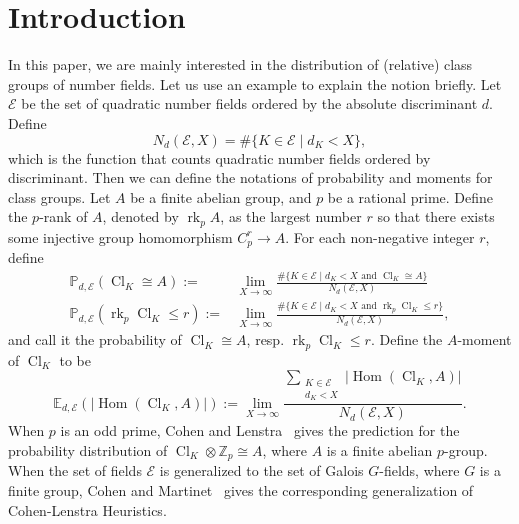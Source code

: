 \documentclass{amsart}
\numberwithin{equation}{section}
\theoremstyle{plain}
\theoremstyle{definition}
\theoremstyle{remark}
\begin{document}
\section{Introduction}\label{section: intro}
In this paper, we are mainly interested in the distribution of (relative) class groups of number fields.
Let us use an example to explain the notion briefly.
Let $\mathcal{E}$ be the set of quadratic number fields ordered by the absolute discriminant $d$.
Define
\begin{equation*}
	N_{d}(\mathcal{E},X)=\#\{K\in\mathcal{E}\mid d_K<X\},
\end{equation*}
which is the function that counts quadratic number fields ordered by discriminant.
Then we can define the notations of probability and moments for class groups.
Let $A$ be a finite abelian group, and $p$ be a rational prime.
Define the $p$-rank of $A$, denoted by $\operatorname{rk}_pA$, as the largest number $r$ so that there exists some injective group homomorphism $C_p^r\to A$.
For each non-negative integer $r$, define
\begin{equation*}
	\begin{aligned}
		\mathbb{P}_{d,\mathcal{E}}(\operatorname{Cl}_K\cong A):=
		&\lim_{X\to\infty}
		\frac{
			\#\{K\in\mathcal{E}\mid d_K<X\text{ and }\operatorname{Cl}_K\cong A\}
		}
		{
			N_{d}(\mathcal{E},X)
		}
		\\
		\mathbb{P}_{d,\mathcal{E}}(\operatorname{rk}_p\operatorname{Cl}_K\leq r):=
		&\lim_{X\to\infty}
		\frac{
			\#\{K\in\mathcal{E}\mid d_K<X\text{ and }\operatorname{rk}_p\operatorname{Cl}_K\leq r\}
		}
		{
			N_{d}(\mathcal{E},X)
		},
	\end{aligned}	
\end{equation*}
and call it the probability of $\operatorname{Cl}_K\cong A$, resp. $\operatorname{rk}_p\operatorname{Cl}_K\leq r$.
Define the $A$-moment of $\operatorname{Cl}_K$ to be
\begin{equation*}
	\mathbb{E}_{d,\mathcal{E}}(\lvert\operatorname{Hom}(\operatorname{Cl}_K,A)\rvert):=
	\lim_{X\to\infty}
	\frac{
		\sum_{
			\substack{
				K\in\mathcal{E}\\
				d_K<X
			}
		}
		\lvert\operatorname{Hom}(\operatorname{Cl}_{K},A)\rvert
	}{
		N_{d}(\mathcal{E},X)
	}.
\end{equation*}
When $p$ is an odd prime, Cohen and Lenstra~\cite{CL84} gives the prediction for the probability distribution of $\operatorname{Cl}_K\otimes\mathbb{Z}_p\cong A$, where $A$ is a finite abelian $p$-group.
When the set of fields $\mathcal{E}$ is generalized to the set of Galois $G$-fields, where $G$ is a finite group, Cohen and Martinet~\cite{CM90} gives the corresponding generalization of Cohen-Lenstra Heuristics.
\end{document}
